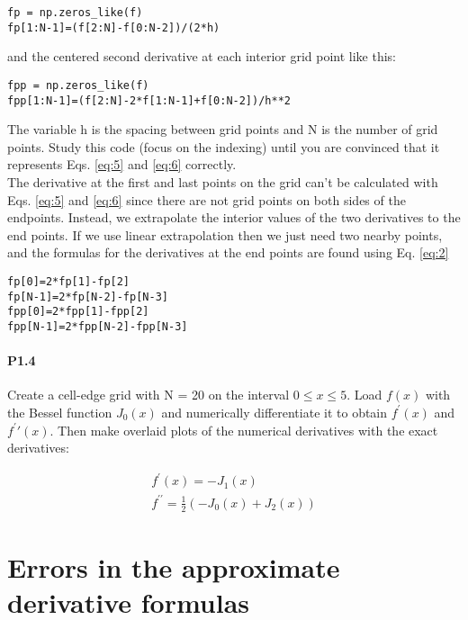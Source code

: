\begin{lstlisting}
fp = np.zeros_like(f)
fp[1:N-1]=(f[2:N]-f[0:N-2])/(2*h)
\end{lstlisting}
and the centered second derivative at each interior grid point like this:
\begin{lstlisting}
fpp = np.zeros_like(f) 
fpp[1:N-1]=(f[2:N]-2*f[1:N-1]+f[0:N-2])/h**2
\end{lstlisting}

The variable h is the spacing between grid points and N is the number of grid points. Study this code (focus on the indexing) until you are convinced that it represents Eqs. \eqref{eq:5} and \eqref{eq:6} correctly. \\The derivative at the first and last points on the grid can\rq t be calculated with Eqs.  \eqref{eq:5} and \eqref{eq:6} since there are not grid points on both sides of the endpoints. Instead, we extrapolate the interior values of the two derivatives to the end points. If we use linear extrapolation then we just need two nearby points, and the formulas for the derivatives at the end points are found using Eq. \eqref{eq:2}
\begin{lstlisting}
fp[0]=2*fp[1]-fp[2] 
fp[N-1]=2*fp[N-2]-fp[N-3] 
fpp[0]=2*fpp[1]-fpp[2] 
fpp[N-1]=2*fpp[N-2]-fpp[N-3]
\end{lstlisting}

\paragraph*{P1.4}
Create a cell-edge grid with N = 20 on the interval $0 \leq x \leq 5$. Load $f(x)$ with the Bessel function $J_0(x)$ and numerically differentiate it to obtain $f^\prime(x)$ and $f^\prime\prime(x)$. Then make overlaid plots of the numerical derivatives with the exact derivatives:


\begin{equation*}
\begin{split}
			f^\prime(x) = -J_1(x)\\
			f^{\prime\prime} = \frac{1}{2}(-J_0(x)+J_2(x))	
			\end{split}
\end{equation*}

\section*{Errors in the approximate derivative formulas}

